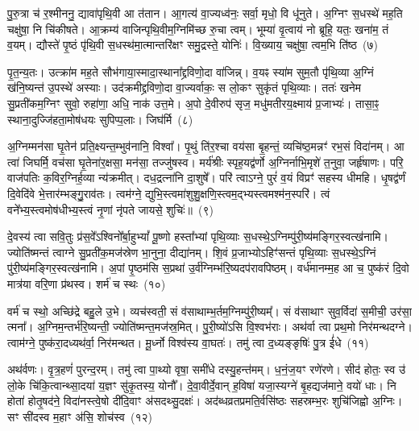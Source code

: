 पु॒रु॒त्रा च॑ र॒श्मीननु॒ द्यावा॑पृथि॒वी आ त॑तान। आ॒गत्य॑ वा॒ज्यध्व॑नः॒ सर्वा॒ मृधो॒ वि धू॑नुते। अ॒ग्निꣳ स॒धस्थे॑ मह॒ति चक्षु॑षा॒ नि चि॑कीषते। आ॒क्रम्य॑ वाजिन्पृथि॒वीम॒ग्निमि॑च्छ रु॒चा त्वम्। भूम्या॑ वृ॒त्वाय॑ नो ब्रूहि॒ यतः॒ खना॑म॒ तं व॒यम्। द्यौस्ते॑ पृ॒ष्ठं पृ॑थि॒वी स॒धस्थ॑मा॒त्मान्तरि॑क्षꣳ समु॒द्रस्ते॒ योनिः॑। वि॒ख्याय॒ चक्षु॑षा॒ त्वम॒भि ति॑ष्ठ~(७)

पृ॒त॒न्य॒तः। उत्क्रा॑म मह॒ते सौभ॑गाया॒स्मादा॒स्थाना᳚द्द्रविणो॒दा वा॑जिन्न्। व॒यꣴ स्या॑म सुम॒तौ पृ॑थि॒व्या अ॒ग्निं ख॑नि॒ष्यन्त॑ उ॒पस्थे॑ अस्याः। उद॑क्रमीद्द्रविणो॒दा वा॒ज्यर्वाकः॒ स लो॒कꣳ सुकृ॑तं पृथि॒व्याः। ततः॑ खनेम सु॒प्रती॑कम॒ग्निꣳ सुवो॒ रुहा॑णा॒ अधि॒ नाक॑ उत्त॒मे। अ॒पो दे॒वीरुप॑ सृज॒ मधु॑मतीरय॒क्ष्माय॑ प्र॒जाभ्यः॑। तासा॒ꣴ॒ स्थाना॒दुज्जि॑हता॒मोष॑धयः सुपिप्प॒लाः। जिघ॑र्मि~(८)

अ॒ग्निम्मन॑सा घृ॒तेन॑ प्रति॒क्ष्यन्त॒म्भुव॑नानि॒ विश्वा᳚। पृ॒थुं ति॑र॒श्चा वय॑सा बृ॒हन्तं॒ व्यचि॑ष्ठ॒मन्नꣳ॑ रभ॒सं विदा॑नम्। आ त्वा॑ जिघर्मि॒ वच॑सा घृ॒तेना॑र॒क्षसा॒ मन॑सा॒ तज्जु॑षस्व। मर्य॑श्रीः स्पृह॒यद्व॑र्णो अ॒ग्निर्नाभि॒मृशे॑ त॒नुवा॒ जर्\mbox{}हृ॑षाणः। परि॒ वाज॑पतिः क॒विर॒ग्निर्\mbox{}ह॒व्या न्य॑क्रमीत्। दध॒द्रत्ना॑नि दा॒शुषे᳚। परि॑ त्वाऽग्ने॒ पुरं॑ व॒यं विप्रꣳ॑ सहस्य धीमहि। धृ॒षद्व॑र्णं दि॒वेदि॑वे भे॒त्तार॑म्भङ्गु॒॒राव॑तः। त्वम॑ग्ने॒ द्युभि॒स्त्वमा॑शुशु॒क्षणि॒स्त्वम॒द्भ्यस्त्वमश्म॑न॒स्परि॑। त्वं वने᳚भ्य॒स्त्वमोष॑धीभ्य॒स्त्वं नृ॒णां नृ॑पते जायसे॒ शुचिः॑॥~(९)

{\anuvakamend[{प्र॒तूर्व॒न्थ्सूर्य॑स्य तिष्ठ॒ जिघ॑र्मि भे॒त्तारं॑ विꣳश॒तिश्च॑}]}%

दे॒वस्य॑ त्वा सवि॒तुः प्र॑स॒वे᳚\-ऽश्विनो᳚र्बा॒हु\-भ्यां᳚ पू॒ष्णो हस्ता᳚भ्यां पृथि॒व्याः स॒धस्थे॒\-ऽग्निम्पु॑री॒ष्य॑मङ्गिर॒स्व\-त्ख॑नामि। ज्योति॑ष्मन्तं त्वाग्ने सु॒प्रती॑क॒मज॑स्रेण भा॒नुना॒ दीद्या॑नम्। शि॒वं प्र॒जाभ्यो\-ऽहिꣳ॑सन्तं पृथि॒व्याः स॒धस्थे॒\-ऽग्निं पु॑री॒ष्य॑मङ्गिर॒स्वत्ख॑नामि। अ॒पां पृ॒ष्ठम॑सि स॒प्रथा॑ उ॒र्व॑ग्निम्भ॑रि॒ष्यदप॑रावपिष्ठम्। वर्ध॑मानम्म॒ह आ च॒ पुष्क॑रं दि॒वो मात्र॑या वरि॒णा प्र॑थस्व। शर्म॑ च स्थः~(१०)

वर्म॑ च स्थो॒ अच्छि॑द्रे बहु॒ले उ॒भे। व्यच॑स्वती॒ सं व॑साथाम्भ॒र्तम॒ग्निम्पु॑री॒ष्यम्᳚। सं व॑साथाꣳ सुव॒र्विदा॑ स॒मीची॒ उर॑सा॒ त्मना᳚। अ॒ग्निम॒न्तर्भ॑रि॒ष्यन्ती॒ ज्योति॑ष्मन्त॒मज॑स्र॒मित्। पु॒री॒ष्यो॑\-ऽसि वि॒श्वभ॑राः। अथ॑र्वा त्वा प्रथ॒मो निर॑मन्थदग्ने। त्वाम॑ग्ने॒ पुष्क॑रा॒दध्यथ॑र्वा॒ निर॑मन्थत। मू॒र्ध्नो विश्व॑स्य वा॒घतः॑। तमु॑ त्वा द॒ध्यङ्ङृषिः॑ पु॒त्र ई॑धे~(११)

अथ॑र्वणः। वृ॒त्र॒हणं॑ पुरन्द॒रम्। तमु॑ त्वा पा॒थ्यो वृषा॒ समी॑धे दस्यु॒हन्त॑मम्। ध॒नं॒ज॒यꣳ रणे॑रणे। सीद॑ होतः॒ स्व उ॑ लो॒के चि॑कि॒त्वान्थ्सा॒दया॑ य॒ज्ञꣳ सु॑कृ॒तस्य॒ योनौ᳚। दे॒वा॒वीर्दे॒वान् ह॒विषा॑ यजा॒स्यग्ने॑ बृ॒हद्यज॑माने॒ वयो॑ धाः। नि होता॑ होतृ॒षद॑ने॒ विदा॑नस्त्वे॒षो दी॑दि॒वाꣳ अ॑सदथ्सु॒दक्षः॑। अद॑ब्धव्रतप्रमति॒र्वसि॑ष्ठः सहस्रम्भ॒रः शुचि॑जिह्वो अ॒ग्निः। सꣳ सी॑दस्व म॒हाꣳ अ॑सि॒ शोच॑स्व~(१२)

